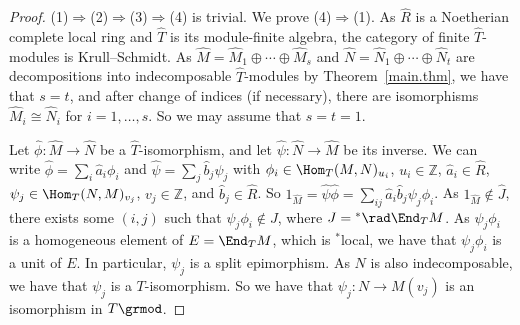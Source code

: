 \documentclass[11pt,leqno]{article}
\theoremstyle{definition}
\theoremstyle{remark}
\theoremstyle{remark}
\def\ZZ{{\mathbb{Z}}}
\begin{document}
\begin{proof}
  (1)$\Rightarrow$(2)$\Rightarrow$(3)$\Rightarrow$(4) is trivial.
  We prove (4)$\Rightarrow$(1).
  As $\hat R$ is a Noetherian complete local ring and $\hat T$ is its module-finite algebra,
  the category of finite $\hat T$-modules is Krull--Schmidt.
  As $\hat M=\hat M_1\oplus\cdots\oplus \hat M_s$ and $\hat N=\hat N_1\oplus \cdots\oplus \hat N_t$
  are decompositions into indecomposable $\hat T$-modules by Theorem~\ref{main.thm},
  we have that $s=t$, and after change of indices (if necessary), there are isomorphisms
  $\hat M_i\cong \hat N_i$ for $i=1,\ldots,s$.
  So we may assume that $s=t=1$.

  Let $\hat\phi:\hat M\rightarrow \hat N$ be a $\hat T$-isomorphism, and let
  $\hat \psi:\hat N\rightarrow \hat M$ be its inverse.
  We can write $\hat\phi=\sum_i\hat a_i\phi_i$ and $\hat \psi=\sum_j\hat b_j\psi_j$ with
  $\phi_i\in\Hom_T(M,N)_{u_i}$, $u_i\in\ZZ$, $\hat a_i\in\hat R$,
  $\psi_j\in\Hom_T(N,M)_{v_j}$, $v_j\in\ZZ$, and $\hat b_j\in\hat R$.
  So $1_{\hat M}=\hat \psi\hat\phi=\sum_{ij}\hat a_i\hat b_j\psi_j\phi_i$.
  As $1_{\hat M}\notin \hat J$, there exists some $(i,j)$ such that
  $\psi_j\phi_i\notin J$, where $J={}^*\rad\End_TM$.
  As $\psi_j\phi_i$ is a homogeneous element of $E=\End_TM$, which is ${}^*$local,
  we have that $\psi_j\phi_i$ is a unit of $E$.
  In particular, $\psi_j$ is a split epimorphism.
  As $N$ is also indecomposable, we have that $\psi_j$ is a $T$-isomorphism.
  So we have that $\psi_j:N\rightarrow M(v_j)$ is an isomorphism in $T\grmod$.
\end{proof}
  
\end{document}
